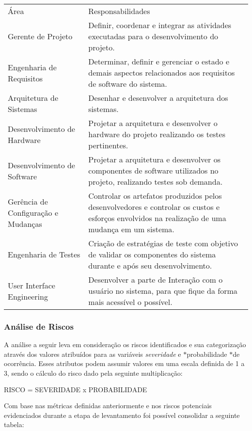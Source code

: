 \tabulinesep=1mm
\begin{longtabu} spread 0pt [c]{*2{|X[-1]}|}
\hline
Área &Responsabilidades  \\
Gerente de Projeto &Definir, coordenar e integrar as atividades executadas para o desenvolvimento do projeto.  \\
Engenharia de Requisitos &Determinar, definir e gerenciar o estado e demais aspectos relacionados aos requisitos de software do sistema.  \\
Arquitetura de Sistemas &Desenhar e desenvolver a arquitetura dos sistemas.  \\
Desenvolvimento de Hardware &Projetar a arquitetura e desenvolver o hardware do projeto realizando os testes pertinentes.  \\
Desenvolvimento de Software &Projetar a arquitetura e desenvolver os componentes de software utilizados no projeto, realizando testes sob demanda.  \\
Gerência de Configuração e Mudanças &Controlar os artefatos produzidos pelos desenvolvedores e controlar os custos e esforços envolvidos na realização de uma mudança em um sistema.  \\
Engenharia de Testes &Criação de estratégias de teste com objetivo de validar os componentes do sistema durante e após seu desenvolvimento.  \\
User Interface Engineering &Desenvolver a parte de Interação com o usuário no sistema, para que fique da forma mais acessível o possível.  \\
\end{longtabu}


\subsubsection*{Análise de Riscos }

A análise a seguir leva em consideração os riscos identificados e sua categorização através dos valores atribuídos para as variáveis {\itshape severidade} e $\ast$probabilidade $\ast$de ocorrência. Esses atributos podem assumir valores em uma escala definida de 1 a 3, sendo o cálculo do risco dado pela seguinte multiplicação\+:

R\+I\+S\+CO = S\+E\+V\+E\+R\+I\+D\+A\+DE x P\+R\+O\+B\+A\+B\+I\+L\+I\+D\+A\+DE

Com base nas métricas definidas anteriormente e nos riscos potenciais evidenciados durante a etapa de levantamento foi possível consolidar a seguinte tabela\+:

